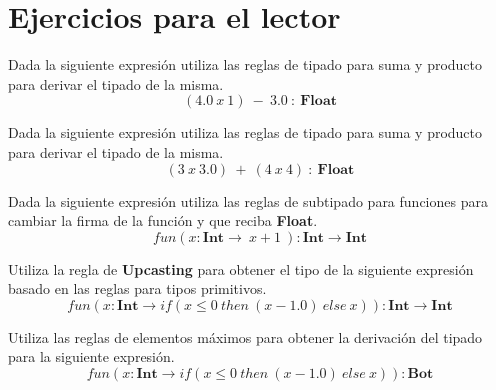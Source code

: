     \newpage


\section{Ejercicios para el lector}


    \begin{exercise}
        Dada la siguiente expresión utiliza las reglas de tipado para suma y producto para derivar el tipado de la misma.
        $$ (4.0\ x\ 1)\ -\ 3.0\ : \ \textbf{Float}$$
    \end{exercise}

    \bigskip

    \begin{exercise}
        Dada la siguiente expresión utiliza las reglas de tipado para suma y producto para derivar el tipado de la misma.
        $$ (3\ x\ 3.0)\ +\ (4\ x\ 4)\ : \ \textbf{Float}$$
    \end{exercise}

    \bigskip

    \begin{exercise}
        Dada la siguiente expresión utiliza las reglas de subtipado para funciones para cambiar la firma de la función y que reciba \textbf{Float}.
        $$ fun(x:\textbf{Int} \rightarrow \ x + 1\ ) : \textbf{Int}  \rightarrow \textbf{Int} $$
    \end{exercise}

    \bigskip

    \begin{exercise}
        Utiliza la regla de \textbf{Upcasting} para obtener el tipo de la siguiente expresión basado en las reglas para tipos primitivos.
        $$ fun(x:\textbf{Int} \rightarrow if( x \leq 0\ then\ (x - 1.0) \ else\ x  ) ) : \textbf{Int}  \rightarrow \textbf{Int} $$
    \end{exercise}

    \bigskip

    \begin{exercise}
        Utiliza las reglas de elementos máximos para obtener la derivación del tipado para la siguiente expresión.
        $$ fun(x:\textbf{Int} \rightarrow if( x \leq 0\ then\ (x - 1.0) \ else\ x  ) ) : \textbf{Bot} $$
    \end{exercise}
 